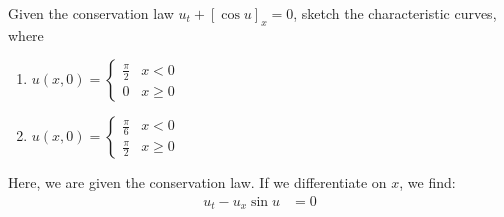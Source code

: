\item Given the conservation law $u_t + [\cos u]_x = 0$, sketch the characteristic curves, where
%
\begin{enumerate}
  \item
  $
  \displaystyle
  u(x, 0) =
  \begin{cases}
    \frac{\pi}{2} & x < 0\\
    0 & x \geq 0
  \end{cases}
  $

  \item
  $
  \displaystyle
  u(x, 0) =
  \begin{cases}
    \frac{\pi}{6} & x < 0\\
    \frac{\pi}{2} & x \geq 0
  \end{cases}
  $
\end{enumerate}

\bigbreak

Here, we are given the conservation law. If we differentiate on $x$, we find:
%
\begin{align}
  u_t - u_x \sin u & = 0
\end{align}
